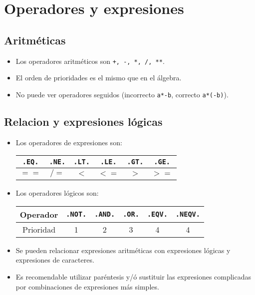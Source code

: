 \section{Operadores y expresiones}

\subsection{Aritméticas}

\begin{itemize}
    \item Los operadores aritméticos son {\tt +, -, *, /, **}.
    \item El orden de prioridades es el mismo que en el álgebra.
    \item No puede ver operadores seguidos (incorrecto {\tt a*-b}, correcto {\tt a*(-b)}).
\end{itemize}

\subsection{Relacion y expresiones lógicas}

\begin{itemize}
    \item Los operadores de expresiones son: 
    \begin{table}[h!] \centering
        \begin{tabular}{|c|c|c|c|c|c|}
            \hline 
            {\tt .EQ.} & {\tt .NE.} & {\tt .LT.} & {\tt .LE.} & {\tt .GT.} & {\tt .GE.} \\ \hline
            $==$ & $/=$ & $<$ & $<=$ & $>$ & $>=$ \\    \hline        
        \end{tabular}
    \end{table}
    \item Los operadores lógicos son:
    \begin{table}[h!] \centering
        \begin{tabular}{|c|c|c|c|c|c|}
            \hline  Operador &  {\tt .NOT.} & {\tt .AND.} & {\tt .OR.} & {\tt .EQV.} & {\tt .NEQV.}  \\ \hline Prioridad
             & 1 & 2 & 3 & 4 & 4 \\    \hline        
        \end{tabular}
    \end{table}

    \item Se pueden relacionar expresiones aritméticas con expresiones lógicas y expresiones de caracteres. 
    \item Es recomendable utilizar paréntesis y/ó sustituir las expresiones complicadas por combinaciones de expresiones más simples.
\end{itemize}